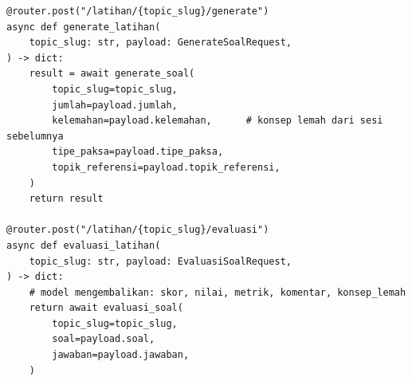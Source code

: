 \begin{lstlisting}[style=javascriptstyle, caption={Implementasi \textit{Endpoint} Generate dan Evaluasi Soal Adaptif}, label={lst:backend-ai}]
@router.post("/latihan/{topic_slug}/generate")
async def generate_latihan(
    topic_slug: str, payload: GenerateSoalRequest,
) -> dict:
    result = await generate_soal(
        topic_slug=topic_slug,
        jumlah=payload.jumlah,
        kelemahan=payload.kelemahan,      # konsep lemah dari sesi sebelumnya
        tipe_paksa=payload.tipe_paksa,
        topik_referensi=payload.topik_referensi,
    )
    return result

@router.post("/latihan/{topic_slug}/evaluasi")
async def evaluasi_latihan(
    topic_slug: str, payload: EvaluasiSoalRequest,
) -> dict:
    # model mengembalikan: skor, nilai, metrik, komentar, konsep_lemah
    return await evaluasi_soal(
        topic_slug=topic_slug,
        soal=payload.soal,
        jawaban=payload.jawaban,
    )
\end{lstlisting}
